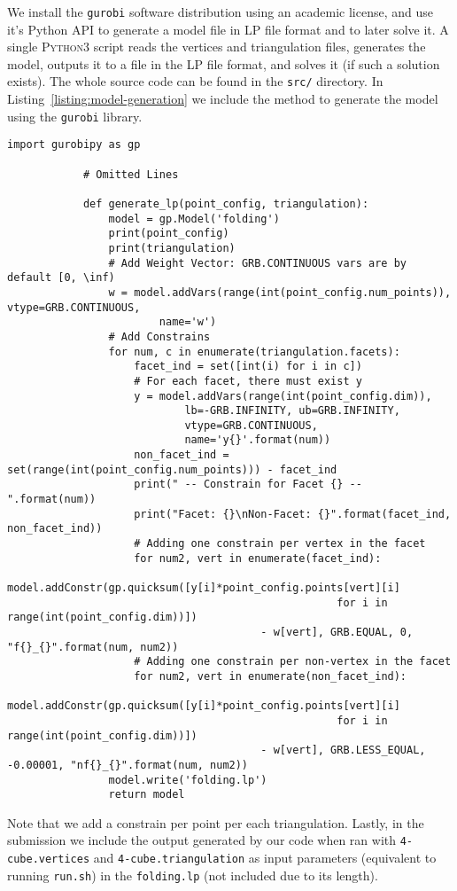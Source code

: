 \begin{enumerate}
    We install the \texttt{gurobi} software distribution using an academic license, and use it's Python API to generate a model file in LP file format and to later solve it.
    A single \textsc{Python3} script reads the vertices and triangulation files, generates the model, outputs it to a file in the LP file format, and solves it (if such a solution exists).
    The whole source code can be found in the \texttt{src/} directory.
    In Listing~\ref{listing:model-generation} we include the method to generate the model using the \texttt{gurobi} library.
        \begin{lstlisting}[style=python,caption={Code to generate the set of folding conditions given a point configuration and a triangulation.\label{listing:model-generation}}]
            import gurobipy as gp

            # Omitted Lines

            def generate_lp(point_config, triangulation):
                model = gp.Model('folding')
                print(point_config)
                print(triangulation)
                # Add Weight Vector: GRB.CONTINUOUS vars are by default [0, \inf)
                w = model.addVars(range(int(point_config.num_points)), vtype=GRB.CONTINUOUS,
                        name='w')
                # Add Constrains
                for num, c in enumerate(triangulation.facets):
                    facet_ind = set([int(i) for i in c])
                    # For each facet, there must exist y
                    y = model.addVars(range(int(point_config.dim)), 
                            lb=-GRB.INFINITY, ub=GRB.INFINITY,
                            vtype=GRB.CONTINUOUS,
                            name='y{}'.format(num))
                    non_facet_ind = set(range(int(point_config.num_points))) - facet_ind 
                    print(" -- Constrain for Facet {} -- ".format(num))
                    print("Facet: {}\nNon-Facet: {}".format(facet_ind, non_facet_ind))
                    # Adding one constrain per vertex in the facet
                    for num2, vert in enumerate(facet_ind):
                        model.addConstr(gp.quicksum([y[i]*point_config.points[vert][i] 
                                                    for i in range(int(point_config.dim))])
                                        - w[vert], GRB.EQUAL, 0, "f{}_{}".format(num, num2))
                    # Adding one constrain per non-vertex in the facet
                    for num2, vert in enumerate(non_facet_ind):
                        model.addConstr(gp.quicksum([y[i]*point_config.points[vert][i] 
                                                    for i in range(int(point_config.dim))])
                                        - w[vert], GRB.LESS_EQUAL, -0.00001, "nf{}_{}".format(num, num2))
                model.write('folding.lp')
                return model
        \end{lstlisting}
        Note that we add a constrain per point per each triangulation.
        Lastly, in the submission we include the output generated by our code when ran with \texttt{4-cube.vertices} and \texttt{4-cube.triangulation} as input parameters (equivalent to running \texttt{run.sh}) in the \texttt{folding.lp} (not included due to its length).


\end{enumerate}
